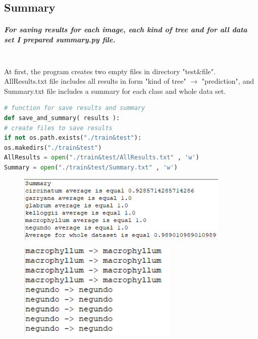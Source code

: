 \documentclass[12pt]{article}
\begin{document}
\newpage

\subsection{Summary}

\subparagraph{
For saving results for each image, each kind of tree and for all data set I prepared summary.py file. \\\\
}

At first, the program creates two empty files in directory "test\&file". AllResults.txt file includes all results in form "kind of tree"
$\rightarrow$
"prediction", and Summary.txt file includes a summary for each class and whole data set.

\begin{lstlisting}[language=Python]
# function for save results and summary
def save_and_summary( results ):
# create files to save results
if not os.path.exists("./train&test"):
os.makedirs("./train&test")
AllResults = open("./train&test/AllResults.txt" , 'w')
Summary = open("./train&test/Summary.txt" , 'w')
\end{lstlisting}

\begin{center}
\begin{figure}[h!]
\centering
\includegraphics[width = 4in]{summary_sample.png}
\end{figure}
\end{center}

\begin{center}
\begin{figure}[h!]
\centering
\includegraphics[width =3in]{allresults_sample.png}
\end{figure}
\end{center}
\end{document}
